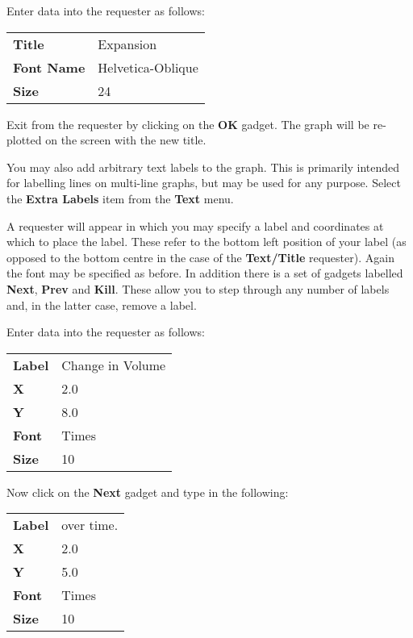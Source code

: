Enter data into the requester as follows:

\begin{tabular}{ll}
{\bf Title}       & Expansion          \\
{\bf Font Name}   & Helvetica-Oblique  \\
{\bf Size}        & 24                 \\
\end{tabular}

\noindent Exit from the requester by clicking on the {\bf OK} gadget.
The graph will be re-plotted on the screen with the new title.

You may also add arbitrary text labels to the graph. 
This is primarily intended for labelling lines on multi-line graphs, but may be 
used for any purpose. Select the {\bf Extra Labels} item from the {\bf Text} menu. 

A requester will appear in which you may specify a label and coordinates at which 
to place the label. These refer to the bottom left position of your label 
(as opposed to the bottom centre in the case of the {\bf Text/Title} requester). 
Again the font may be specified as before. In addition there is a set of gadgets 
labelled {\bf Next}, {\bf Prev} and {\bf Kill}. These allow you to step through 
any number of labels and, in the latter case, remove a label.

Enter data into the requester as follows:

\begin{tabular}{ll}
{\bf Label} & Change in Volume   \\
{\bf X}     & 2.0                \\
{\bf Y}     & 8.0                \\
{\bf Font}  & Times              \\
{\bf Size}  & 10                 \\
\end{tabular}

\noindent Now click on the {\bf Next} gadget and type in the following:

\begin{tabular}{ll}
{\bf Label} & over time.   \\
{\bf X}     & 2.0          \\
{\bf Y}     & 5.0          \\
{\bf Font}  & Times        \\
{\bf Size}  & 10           \\
\end{tabular}

